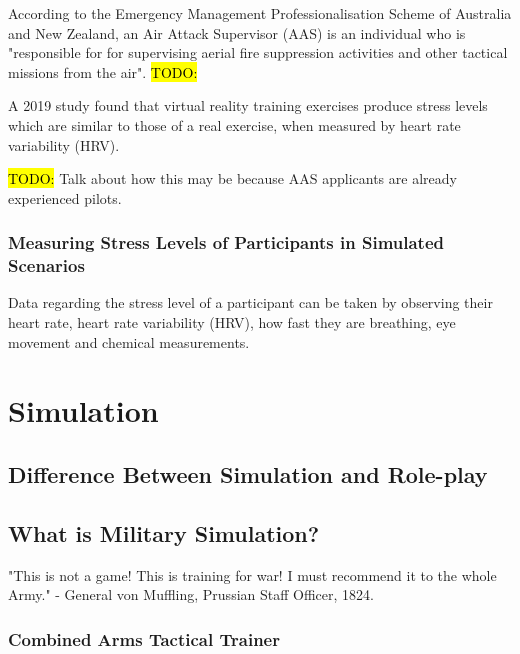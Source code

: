 \documentclass{article}
\begin{document}
According to the Emergency Management Professionalisation Scheme of Australia and New Zealand, an Air Attack Supervisor (AAS) is an individual who is "responsible for for supervising aerial fire suppression activities and other tactical missions from the air". \hl{TODO:}


A 2019 study found that virtual reality training exercises produce stress levels which are similar to those of a real exercise, when measured by heart rate variability (HRV). \cite{8797889}

\hl{TODO:} Talk about how this may be because AAS applicants are already experienced pilots.

\subsubsection{Measuring Stress Levels of Participants in Simulated Scenarios}

Data regarding the stress level of a participant can be taken by observing their heart rate, heart rate variability (HRV), how fast they are breathing, eye movement and chemical measurements. \cite{8797889}

\section{Simulation}

\subsection{Difference Between Simulation and Role-play}



\subsection{What is Military Simulation?}

"This is not a game! This is training for war! I must recommend it to the whole Army." - General von Muffling, Prussian Staff Officer, 1824.

\subsubsection{Combined Arms Tactical Trainer}

\end{document}
